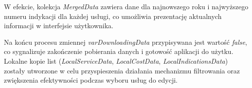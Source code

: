 W efekcie, kolekcja \emph{MergedData} zawiera dane dla najnowszego roku i najwyższego numeru indykacji dla każdej usługi, co umożliwia prezentację aktualnych informacji w interfejsie użytkownika.

Na końcu procesu zmiennej \emph{varDownloadingData} przypisywana jest wartość \emph{false}, co sygnalizuje zakończenie pobierania danych i gotowość aplikacji do użytku. Lokalne kopie list (\emph{LocalServiceData}, \emph{LocalCostData}, \emph{LocalIndicationsData}) zostały utworzone w celu przyspieszenia działania mechanizmu filtrowania oraz zwiększenia efektywności podczas wyboru usług do edycji.




